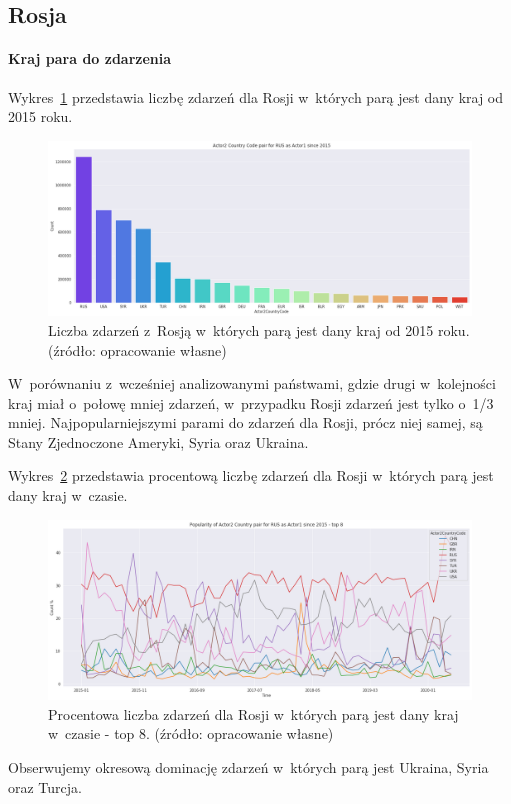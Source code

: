 \documentclass[11pt]{report}
\begin{document}
    \subsection{Rosja}

    \paragraph{Kraj para do zdarzenia}

    Wykres~\ref{fig:RUSpair} przedstawia liczbę zdarzeń dla Rosji w~których parą jest dany kraj od 2015 roku.

    \begin{figure}[!htp]
        \centering
        \includegraphics[width=\linewidth]{fig/RUS/RUSactor2Pair.png}
        \caption{Liczba zdarzeń z~Rosją w~których parą jest dany kraj od 2015 roku. (źródło: opracowanie własne)}
        \label{fig:RUSpair}
    \end{figure}
    W~porównaniu z~wcześniej analizowanymi państwami, gdzie drugi w~kolejności kraj miał o~połowę mniej zdarzeń, w~przypadku Rosji zdarzeń jest tylko o~1/3 mniej.
    Najpopularniejszymi parami do zdarzeń dla Rosji, prócz niej samej, są Stany Zjednoczone Ameryki, Syria oraz Ukraina.

    Wykres~\ref{fig:RUSpairPerc} przedstawia procentową liczbę zdarzeń dla Rosji w~których parą jest dany kraj w~czasie.
    \begin{figure}[!htp]
        \centering
        \includegraphics[width=\linewidth]{fig/RUS/RUSactor2PairPercinTIME.png}
        \caption{Procentowa liczba zdarzeń dla Rosji w~których parą jest dany kraj w~czasie - top 8. (źródło: opracowanie własne)}
        \label{fig:RUSpairPerc}
    \end{figure}
    Obserwujemy okresową dominację zdarzeń w~których parą jest Ukraina, Syria oraz Turcja.
\end{document}

